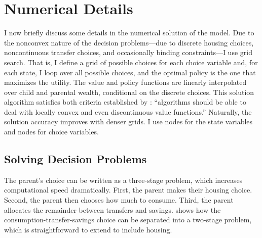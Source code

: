 \documentclass[12pt]{article}
\begin{document}
\section{Numerical Details}\label{sec:computational}
I now briefly discuss some details in the numerical solution of the model. Due to the nonconvex nature of the decision problems---due to discrete housing choices, noncontinuous transfer choices, and occasionally binding constraints---I use grid search. That is, I define a grid of possible choices for each choice variable and, for each state, I loop over all possible choices, and the optimal policy is the one that maximizes the utility. The value and policy functions are linearly interpolated over child and parental wealth, conditional on the discrete choices. This solution algorithm satisfies both criteria established by \cite[p.30]{Barczyk2020}: ``algorithms should be able to deal with locally convex and even discontinuous value functions.'' Naturally, the solution accuracy improves with denser grids. I use {\parnstate} nodes for the state variables and {\parnchoice} nodes for choice variables.

\subsection{Solving Decision Problems} 
The parent's choice can be written as a three-stage problem, which increases computational speed dramatically. First, the parent makes their housing choice. Second, the parent then chooses how much to consume. Third, the parent allocates the remainder between transfers and savings. \cite{Chu2020} shows how the consumption-transfer-savings choice can be separated into a two-stage problem, which is straightforward to extend to include housing.
\end{document}
